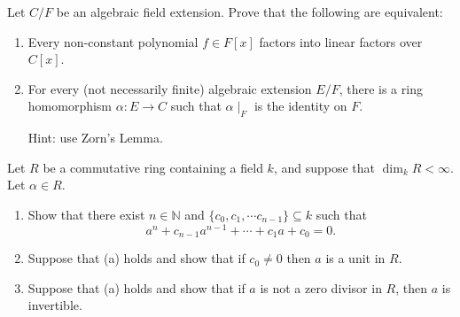 \begin{problem}
Let $C/F$ be an algebraic field extension. Prove that the following are equivalent:
\begin{enumerate}
    \item Every non-constant polynomial $f\in F[x]$ factors into linear factors over $C[x]$.
    \item For every (not necessarily finite) algebraic extension $E/F$, there is a ring homomorphism $\alpha: E \to C$ such that $\alpha \mid_F$ is the identity on $F$.
    
    Hint: use Zorn's Lemma.
\end{enumerate}
\end{problem}

\begin{problem}
Let $R$ be a commutative ring containing a field $k$, and suppose that $\dim_k R < \infty$. Let $\alpha \in R$.
\begin{enumerate}
    \item Show that there exist $n\in \mathbb N$ and $\{ c_0, c_1, \cdots c_{n-1}\} \subseteq k$ such that
    $$
    a^n + c_{n-1}a^{n-1} + \cdots + c_1 a + c_0 = 0.
    $$
    \item Suppose that (a) holds and show that if $c_0 \neq 0$ then $a$ is a unit in $R$.
    \item Suppose that (a) holds and show that if $a$ is not a zero divisor in $R$, then $a$ is invertible.
\end{enumerate}
\end{problem}
